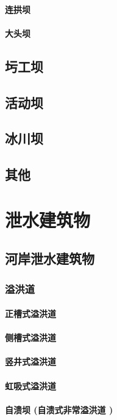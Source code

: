 \documentclass[UTF8]{../../ApplicationUniverse}
\begin{document}
            \paragraph{连拱坝}
            \paragraph{大头坝}
    \subsection{圬工坝}
    \subsection{活动坝}
    \subsection{冰川坝}
    \subsection{其他}
\section{泄水建筑物}
    \subsection{河岸泄水建筑物}
        \subsubsection{溢洪道}
            \paragraph{正槽式溢洪道}
            \paragraph{侧槽式溢洪道}
            \paragraph{竖井式溢洪道}
            \paragraph{虹吸式溢洪道}
            \paragraph{自溃坝 (自溃式非常溢洪道 )}
\end{document}

